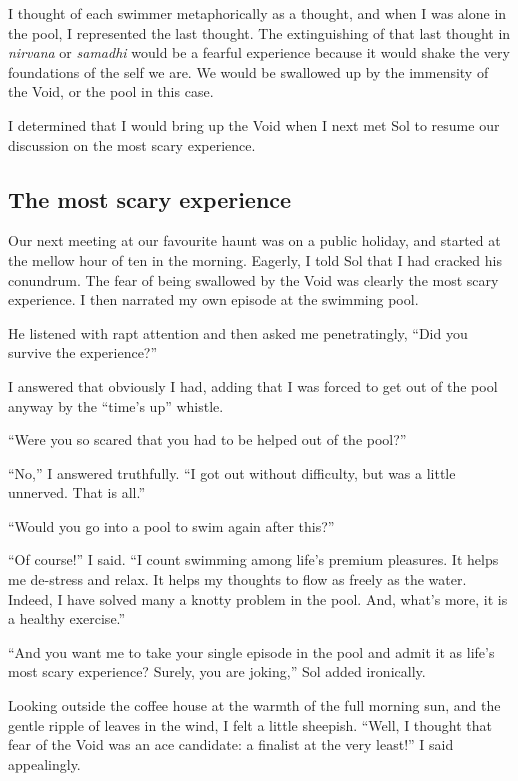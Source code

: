 \documentclass[
  a4paper,
]{article}
\begin{document}
I thought of each swimmer metaphorically as a thought, and when I was
alone in the pool, I represented the last thought. The extinguishing of
that last thought in \emph{nirvana} or \emph{samadhi} would be a fearful
experience because it would shake the very foundations of the self we
are. We would be swallowed up by the immensity of the Void, or the pool
in this case.

I determined that I would bring up the Void when I next met Sol to
resume our discussion on the most scary experience.

\subsection{The most scary experience}\label{the-most-scary-experience}

Our next meeting at our favourite haunt was on a public holiday, and
started at the mellow hour of ten in the morning. Eagerly, I told Sol
that I had cracked his conundrum. The fear of being swallowed by the
Void was clearly the most scary experience. I then narrated my own
episode at the swimming pool.

He listened with rapt attention and then asked me penetratingly, ``Did
you survive the experience?''

I answered that obviously I had, adding that I was forced to get out of
the pool anyway by the ``time's up'' whistle.

``Were you so scared that you had to be helped out of the pool?''

``No,'' I answered truthfully. ``I got out without difficulty, but was a
little unnerved. That is all.''

``Would you go into a pool to swim again after this?''

``Of course!'' I said. ``I count swimming among life's premium
pleasures. It helps me de-stress and relax. It helps my thoughts to flow
as freely as the water. Indeed, I have solved many a knotty problem in
the pool. And, what's more, it is a healthy exercise.''

``And you want me to take your single episode in the pool and admit it
as life's most scary experience? Surely, you are joking,'' Sol added
ironically.

Looking outside the coffee house at the warmth of the full morning sun,
and the gentle ripple of leaves in the wind, I felt a little sheepish.
``Well, I thought that fear of the Void was an ace candidate: a finalist
at the very least!'' I said appealingly.
\end{document}
